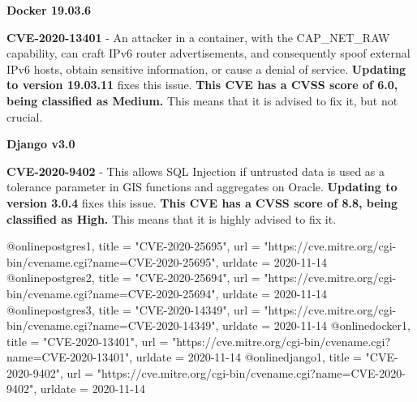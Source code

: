 \textbf{Docker 19.03.6}

\textbf{CVE-2020-13401} - An attacker in a container, with the CAP\_NET\_RAW capability, can craft IPv6 router advertisements, and consequently spoof external IPv6 hosts, obtain sensitive information, or cause a denial of service.\cite{docker1} \textbf{Updating to version 19.03.11} fixes this issue. \textbf{This CVE has a CVSS score of 6.0, being classified as Medium.} This means that it is advised to fix it, but not crucial.



\textbf{Django v3.0}

\begin{comment}
\textbf{CVE-2020-24584}

\textbf{CVE-2020-24583}

\textbf{CVE-2019-19844}

\textbf{CVE-2020-13254}

\textbf{CVE-2020-13596}

\textbf{CVE-2020-7471}
\end{comment}


\textbf{CVE-2020-9402} - This allows SQL Injection if untrusted data is used as a tolerance parameter in GIS functions and aggregates on Oracle.\cite{docker1} \textbf{Updating to version 3.0.4} fixes this issue. \textbf{This CVE has a CVSS score of 8.8, being classified as High.} This means that it is highly advised to fix it.



@online{postgres1,
    title     = "CVE-2020-25695",
    url       = "https://cve.mitre.org/cgi-bin/cvename.cgi?name=CVE-2020-25695",
    urldate = {2020-11-14}
}
@online{postgres2,
    title     = "CVE-2020-25694",
    url       = "https://cve.mitre.org/cgi-bin/cvename.cgi?name=CVE-2020-25694",
    urldate = {2020-11-14}
}
@online{postgres3,
    title     = "CVE-2020-14349",
    url       = "https://cve.mitre.org/cgi-bin/cvename.cgi?name=CVE-2020-14349",
    urldate = {2020-11-14}
}
@online{docker1,
    title     = "CVE-2020-13401",
    url       = "https://cve.mitre.org/cgi-bin/cvename.cgi?name=CVE-2020-13401",
    urldate = {2020-11-14}
}
@online{django1,
    title     = "CVE-2020-9402",
    url       = "https://cve.mitre.org/cgi-bin/cvename.cgi?name=CVE-2020-9402",
    urldate = {2020-11-14}
}

\begin{comment}

\textbf{CVE-2020-24583}

\textbf{CVE-2019-19844}

\textbf{CVE-2020-13596}

\end{comment}